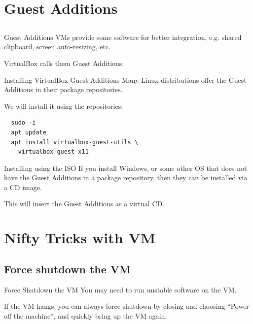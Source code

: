 \documentclass[12pt]{beamer}
\begin{document}
\section{Guest Additions}
\subsection{}
\begin{frame}{Guest Additions}
  VMs provide some software for better integration, e.g. shared clipboard, screen auto-resizing, etc.

  VirtualBox calls them Guest Additions.
\end{frame}

\begin{frame}[fragile]{Installing VirtualBox Guest Additions}
  Many Linux distributions offer the Guest Additions in their package repositories.

  We will install it using the repositories:

  \begin{verbatim}
  sudo -i
  apt update
  apt install virtualbox-guest-utils \
    virtualbox-guest-x11
  \end{verbatim}
\end{frame}

\begin{frame}{Installing using the ISO}
  If you install Windows, or some other OS that does not have the Guest Additions
  in a package repository, then they can be installed via a CD image.


  This will insert the Guest Additions as a virtual CD.
\end{frame}

\section{Nifty Tricks with VM}
\subsection{Force shutdown the VM}
\begin{frame}{Force Shutdown the VM}
  You may need to run unstable software on the VM.

  If the VM hangs, you can always force shutdown by closing and choosing ``Power off the machine'', and quickly bring up the VM again.
\end{frame}
\end{document}
